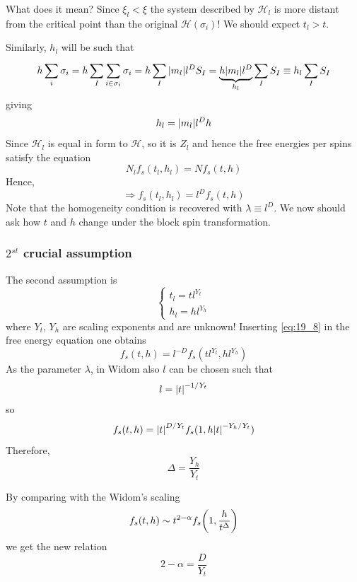\documentclass[../main/main.tex]{subfiles}
\begin{document}
What does it mean? Since \( \xi _l < \xi  \) the system described by \( \mathcal{H}_l \)   is more distant from the critical point than the original \( \mathcal{H} (\sigma _i) \)! We should expect \( t_l > t \).

Similarly, \( h_l \) will be such that
\begin{equation}
  h \sum_{i}^{} \sigma _i = h \sum_{I}^{} \sum_{i \in \sigma _i}^{}  \sigma _i = h \sum_{I}^{}    \abs{m_l} l^D S_I
  = \underbrace{h \abs{m_l} l^D}_{h_l} \sum_{I}^{} S_I \equiv  h_l \sum_{I}^{} S_I
\end{equation}
giving
\begin{equation}
  h_l = \abs{m_l} l^D h
\end{equation}
Since \( \mathcal{H}_l \) is equal in form to \( \mathcal{H} \), so it is \( Z_l \) and hence the free energies per spins satisfy the equation
\begin{equation}
  N_l f_s (t_l,h_l) = N f_s (t,h)
\end{equation}
Hence,
\begin{equation}
  \Rightarrow  f_s (t_l,h_l) = l^D f_s (t,h)
\end{equation}
Note that the homogeneity condition is recovered with \( \lambda \equiv l^D \).
We now should ask how \( t \) and \( h \) change under the block spin transformation.

\subsubsection{\(  2^{st} \) crucial assumption}
The second assumption is
\begin{equation}
  \begin{cases}
     t_l = t l^{Y_t}\\
  h_l = h l^{Y_h}
  \end{cases}
  \label{eq:19_8}
\end{equation}
where \( Y_t, \, Y_h \) are scaling exponents and are unknown!
Inserting \eqref{eq:19_8} in the free energy equation one obtains
\begin{equation}
  f_s (t,h) = l^{-D} f_s (t l^{Y_t}, h l^{Y_h})
\end{equation}
As the parameter \( \lambda  \), in Widom also \( l \)  can be chosen such that
\begin{equation}
  l= \abs{t}^{-1/Y_t}
\end{equation}
so
\begin{equation}
  f_s (t,h) = \abs{t}^{D/Y_t} f_s (1, h \abs{t}^{-Y_h/Y_t} )
\end{equation}
Therefore,
\begin{equation}
  \Delta = \frac{Y_h}{Y_t}
\end{equation}
\begin{remark}
By comparing with the Widom's scaling
\begin{equation}
  f_s (t,h) \sim t^{2- \alpha } f_s \qty(1, \frac{h}{t^\Delta})
\end{equation}
we get the new relation
\begin{equation}
  2 - \alpha = \frac{D}{Y_t}
\end{equation}
\end{remark}
\end{document}

